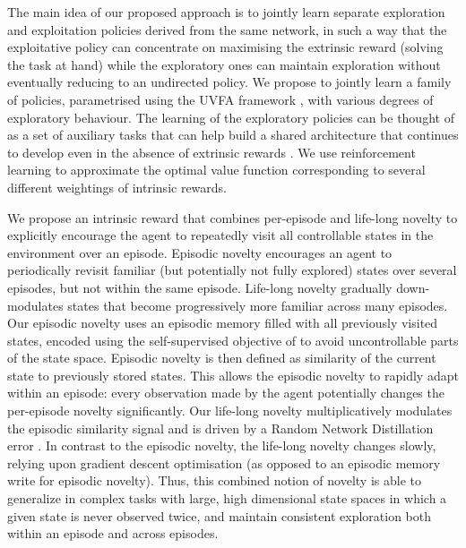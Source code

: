 \documentclass{article} %
\begin{document}
The main idea of our proposed approach is to jointly learn separate exploration and exploitation policies derived from the same network, in such a way that the exploitative policy can concentrate on maximising the extrinsic reward (solving the task at hand) while the exploratory ones can maintain exploration without eventually reducing to an undirected policy. 
%
We propose to jointly learn a family of policies, parametrised using the UVFA framework \citep{schaul2015universal}, with various degrees of exploratory behaviour. 
%
The learning of the exploratory policies can be thought of as a set of auxiliary tasks that can help build a shared architecture that continues to develop even in the absence of extrinsic rewards \citep{jaderberg2016reinforcement}.
%
We use reinforcement learning to approximate the optimal value function corresponding to several different weightings of intrinsic rewards.

We propose an intrinsic reward that combines per-episode and life-long novelty to explicitly encourage the agent to repeatedly visit all controllable states in the environment over an episode.
Episodic novelty encourages an agent to periodically revisit familiar (but potentially not fully explored) states over several episodes, but not within the same episode.
Life-long novelty gradually down-modulates states that become progressively more familiar across many episodes.
Our episodic novelty uses an episodic memory filled with all previously visited states, encoded using the self-supervised objective of \citet{pathak2017curiosity} to avoid uncontrollable parts of the state space.
Episodic novelty is then defined as similarity of the current state to previously stored states.
This allows the episodic novelty to rapidly adapt within an episode: every observation made by the agent potentially changes the per-episode novelty significantly.
Our life-long novelty multiplicatively modulates the episodic similarity signal and is driven by a Random Network Distillation error \citep{burda2018exploration}.
In contrast to the episodic novelty, the life-long novelty changes slowly, relying upon gradient descent optimisation (as opposed to an episodic memory write for episodic novelty).
Thus, this combined notion of novelty is able to generalize in complex tasks with large, high dimensional state spaces in which a given state is never observed twice, and maintain consistent exploration both within an episode and across episodes.
\end{document}
